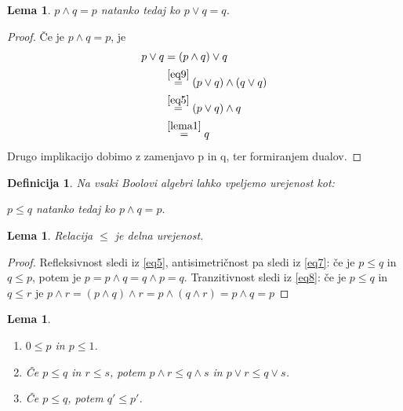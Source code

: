 \documentclass{amsart}
\newtheorem{lema}[izrek]{Lema}
\newtheorem{definicija}[izrek]{Definicija}
\begin{document}
\begin{lema}
    \label{lema2}
    \(p \wedge q = p\) natanko tedaj ko \(p \vee q = q\).
\end{lema}

\begin{proof}
    Če je \(p \wedge q = p\), je 
    \begin{align*}
        p \vee q &\stackrel{}{=} \left(p \wedge q\right) \vee q \\
                    &\stackrel{\eqref{eq9}}{=} \left(p \vee q\right) \wedge \left(q \vee q\right) \\
                    &\stackrel{\eqref{eq5}}{=} \left(p \vee q\right) \wedge q\\
                    &\stackrel{\ref{lema1}}{=} q 
    \end{align*}
    Drugo implikacijo dobimo z zamenjavo p in q, ter formiranjem dualov.
\end{proof}

\begin{definicija}
    Na vsaki Boolovi algebri lahko vpeljemo urejenost kot:
    \begin{center}
        \(p \leq q \) natanko tedaj ko \(p \wedge q  = p.\)
    \end{center}
\end{definicija}

\begin{lema}
    Relacija \(\leq\) je delna urejenost.
\end{lema}

\begin{proof}
    Refleksivnost sledi iz \eqref{eq5}, antisimetričnost pa sledi iz \eqref{eq7}: če je \(p \leq q\) in \(q \leq p\), potem
    je \(p = p \wedge q = q \wedge p = q\). Tranzitivnost sledi iz \eqref{eq8}:
    če je \(p \leq q\) in \(q \leq r\) je \(p\wedge r = \left(p \wedge q\right) \wedge r = p \wedge \left(q \wedge r\right) = p \wedge q = p\)
\end{proof}

\begin{lema}
    \label{lema3}
    \begin{enumerate}
        \item \(0 \leq p\) in \(p \leq 1\).
        \item Če \(p \leq q\) in \(r \leq s\), potem \(p \wedge r \leq q \wedge s\) in \(p \vee r \leq q \vee s\). \label{lema3.2}
        \item Če \(p \leq q\), potem \(q' \leq p'\).
    \end{enumerate}
\end{lema}
\end{document}
